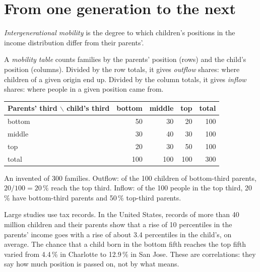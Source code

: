 \section{From one generation to the next}\label{sec:g11:inequality:mobility}

\begin{definition}\label{def:g11:inequality:mobility}
\emph{Intergenerational mobility} is the degree to which children's positions in the income distribution differ from their parents'.
\end{definition}

\begin{definition}\label{def:g11:inequality:mobility-table}
A \emph{mobility table} counts families by the parents' position (rows) and the child's position (columns). Divided by the row totals, it gives
\emph{outflow} shares: where children of a given origin end up. Divided by the column totals, it gives \emph{inflow} shares: where people in a given position came from.
\end{definition}

\begin{omfigure}
\renewcommand{\arraystretch}{1.25}
\begin{tabular}{lrrrr}
\toprule
Parents' third $\backslash$ child's third & bottom & middle & top & total \\
\midrule
bottom & 50 & 30 & 20 & 100 \\
middle & 30 & 40 & 30 & 100 \\
top & 20 & 30 & 50 & 100 \\
\midrule
total & 100 & 100 & 100 & 300 \\
\bottomrule
\end{tabular}

{\small An invented  of 300 families. Outflow: of the 100 children of bottom-third parents, $20/100 = 20\,\%$ reach the top third. Inflow: of the 100
people in the top third, 20\,\% have bottom-third parents and 50\,\% top-third parents.}
\end{omfigure}

Large studies use tax records. In the United States, records of more than 40 million children and their parents show that a rise of 10 percentiles in the parents' income
goes with a rise of about 3.4 percentiles in the child's, on average. The chance that a child born in the bottom fifth reaches the top fifth varied from 4.4\,\% in
Charlotte to 12.9\,\% in San Jose. These are correlations: they say how much position is passed on, not by what means.

